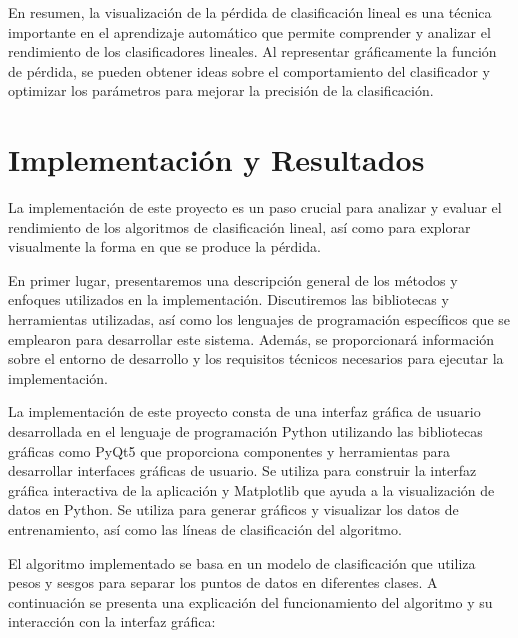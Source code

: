 \documentclass[twoside,10pt]{article}
\numberwithin{equation}{section}
\begin{document}
En resumen, la visualización de la pérdida de clasificación lineal es una técnica importante en el aprendizaje automático que permite comprender y analizar el rendimiento de los clasificadores lineales. Al representar gráficamente la función de pérdida, se pueden obtener ideas sobre el comportamiento del clasificador y optimizar los parámetros para mejorar la precisión de la clasificación.



\section{Implementación y Resultados}
La implementación de este proyecto es un paso crucial para analizar y evaluar el rendimiento de los algoritmos de clasificación lineal, así como para explorar visualmente la forma en que se produce la pérdida.

En primer lugar, presentaremos una descripción general de los métodos y enfoques utilizados en la implementación. Discutiremos las bibliotecas y herramientas utilizadas, así como los lenguajes de programación específicos que se emplearon para desarrollar este sistema. Además, se proporcionará información sobre el entorno de desarrollo y los requisitos técnicos necesarios para ejecutar la implementación.

La implementación de este proyecto consta de una interfaz gráfica de usuario desarrollada en el lenguaje de programación Python utilizando las bibliotecas gráficas como PyQt5 que  proporciona componentes y herramientas para desarrollar interfaces gráficas de usuario. Se utiliza para construir la interfaz gráfica interactiva de la aplicación y Matplotlib que ayuda a la visualización de datos en Python. Se utiliza para generar gráficos y visualizar los datos de entrenamiento, así como las líneas de clasificación del algoritmo.

El algoritmo implementado se basa en un modelo de clasificación que utiliza pesos y sesgos para separar los puntos de datos en diferentes clases. A continuación se presenta una explicación del funcionamiento del algoritmo y su interacción con la interfaz gráfica:
\end{document}
